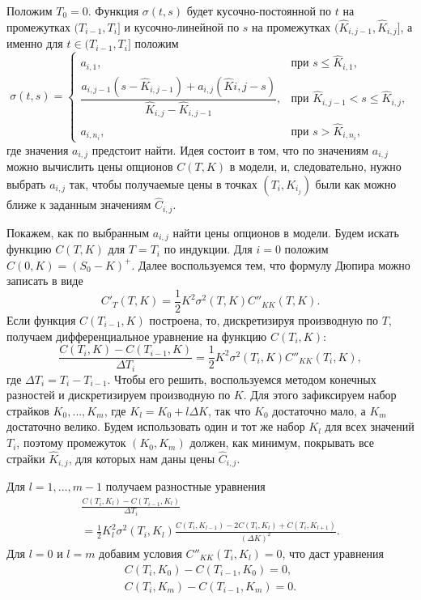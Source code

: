 Положим $T_0=0$.
Функция $\sigma(t,s)$ будет кусочно-постоянной по $t$ на промежутках $(T_{i-1}, T_i]$ и кусочно-линейной по $s$ на промежутках $(\hat K_{i,j-1}, \hat K_{i,j}]$, а именно для $t\in (T_{i-1}, T_i]$ положим
\[
\sigma(t, s) = \begin{cases}
a_{i,1}, 
  &\text{при } s\le \hat K_{i,1},\\
\dfrac{a_{i,j-1}(s-\hat K_{i,j-1}) + a_{i,j}(\hat K{i,j} - s)}{\hat K_{i,j}-\hat K_{i,j-1}}, 
  &\text{при } \hat K_{i,j-1}< s \le \hat K_{i,j},\\
a_{i,n_i}, 
  &\text{при } s> \hat K_{i,n_i},
\end{cases}
\]
где значения $a_{i,j}$ предстоит найти.
Идея состоит в том, что по значениям $a_{i,j}$ можно вычислить цены опционов $C(T, K)$ в модели, и, следовательно, нужно выбрать $a_{i,j}$ так, чтобы получаемые цены в точках $(T_i, K_{i_j})$ были как можно ближе к заданным значениям $\hat C_{i,j}$.

Покажем, как по выбранным $a_{i,j}$ найти цены опционов в модели.
Будем искать функцию $C(T,K)$ для $T=T_i$ по индукции. Для $i=0$ положим $C(0, K) = (S_0-K)^+$.
Далее воспользуемся тем, что формулу Дюпира можно записать в виде
\[
C'_T(T,K) = \frac12 K^2 \sigma^2(T,K)C''_{KK}(T,K).
\]
Если функция $C(T_{i-1}, K)$ построена, то, дискретизируя производную по $T$, получаем дифференциальное уравнение на функцию $C(T_i,K)$:
\[
\frac{C(T_{i},K) - C(T_{i-1},K)}{\Delta T_i} = \frac12 K^2 \sigma^2(T_i,K)C''_{KK}(T_i,K),
\]
где $\Delta T_i = T_i - T_{i-1}$.
Чтобы его решить, воспользуемся методом конечных разностей и дискретизируем производную по $K$.
Для этого зафиксируем набор страйков $K_0,\dots,K_m$, где $K_l = K_0 + l\Delta K$, так что $K_0$ достаточно мало, а $K_m$ достаточно велико.
Будем использовать один и тот же набор $K_l$ для всех значений $T_i$, поэтому промежуток $(K_0, K_m)$ должен, как минимум, покрывать все страйки $\hat K_{i,j}$, для которых нам даны цены $\hat C_{i,j}$.

Для $l=1,\dots,m-1$ получаем разностные уравнения
\begin{multline}
\label{lv:ah-system}
\frac{C(T_i,K_l) - C(T_{i-1}, K_l)}{\Delta T_i} \\
= \frac12 K_l^2 \sigma^2(T_i,K_l) \frac{C(T_i,K_{l-1}) -2C(T_i,K_l) + C(T_i,K_{l+1})}{(\Delta K)^2}.
\end{multline}
Для $l=0$ и $l=m$ добавим условия $C''_{KK}(T_i,K_l) = 0$, что даст уравнения
\begin{gather}
\label{lv:ah-boundary-1}
C(T_i,K_0) - C(T_{i-1}, K_0) = 0,\\
\label{lv:ah-boundary-2}
C(T_i,K_m) - C(T_{i-1}, K_m) = 0.
\end{gather}

